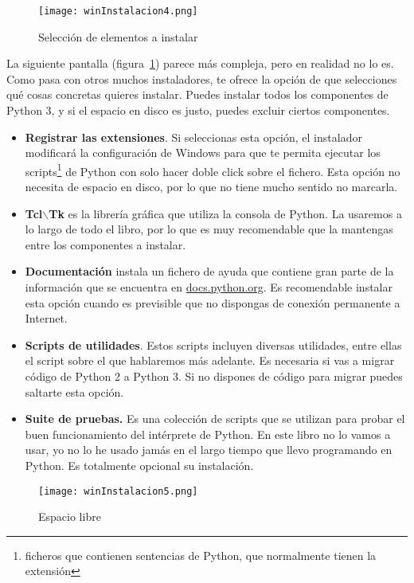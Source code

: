 \begin{figure}[!h]
  \begin{center}
\texttt{[image: winInstalacion4.png]}
\caption{Selección de elementos a instalar}\label{fig04}
  \end{center}
\end{figure}

La siguiente pantalla (figura~\ref{fig04}) parece más compleja, pero en realidad no lo es. Como pasa con otros muchos instaladores, te ofrece la opción de que selecciones qué cosas concretas quieres instalar. Puedes instalar todos los componentes de Python 3, y si el espacio en disco es justo, puedes excluir ciertos componentes.

\begin{itemize}
\item \textbf{Registrar las extensiones}. Si seleccionas esta opción, el instalador modificará la configuración de Windows para que te permita ejecutar los scripts\footnote{ficheros que contienen sentencias de Python, que normalmente tienen la extensión } de Python con solo hacer doble click sobre el fichero. Esta opción no necesita de espacio en disco, por lo que no tiene mucho sentido no marcarla.
\item \textbf{Tcl$\backslash$Tk} es la librería gráfica que utiliza la consola de Python. La usaremos a lo largo de todo el libro, por lo que es muy recomendable que la mantengas entre los componentes a instalar.
\item \textbf{Documentación} instala un fichero de ayuda que contiene gran parte de la información que se encuentra en \href{http://docs.python.org/}{docs.python.org}. Es recomendable instalar esta opción cuando es previsible que no dispongas de conexión permanente a Internet.
\item \textbf{Scripts de utilidades}. Estos scripts incluyen diversas utilidades, entre ellas el script  sobre el que hablaremos más adelante. Es necesaria si vas a migrar código de Python 2 a Python 3. Si no dispones de código para migrar puedes saltarte esta opción.
\item \textbf{Suite de pruebas.} Es una colección de scripts que se utilizan para probar el buen funcionamiento del intérprete de Python. En este libro no lo vamos a usar, yo no lo he usado jamás en el largo tiempo que llevo programando en Python. Es totalmente opcional su instalación.
\end{itemize}

\begin{figure}[!h]
  \begin{center}
\texttt{[image: winInstalacion5.png]}
\caption{Espacio libre}\label{fig05}
  \end{center}
\end{figure}

